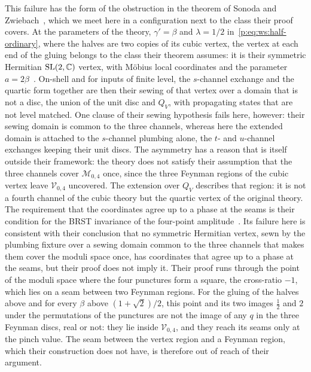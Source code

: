 This failure has the form of the obstruction in the theorem of Sonoda and Zwiebach~\cite{Sonoda:1990:CovariantClosedString}, which we meet here in a configuration next to the class their proof covers.
At the parameters of the theory, $\gamma' = \beta$ and $\lambda = 1 / 2$ in~\eqref{p:eq:ws:half-ordinary}, where the halves are two copies of its cubic vertex, the vertex at each end of the gluing belongs to the class their theorem assumes: it is their symmetric Hermitian $\mathrm{SL}(2, \mathbb{C})$ vertex, with Möbius local coordinates and the parameter $a = 2 \beta$~\cite[eq.~(2.18)]{Sonoda:1990:CovariantClosedString}.
On-shell and for inputs of finite level, the $s$-channel exchange and the quartic form together are then their sewing of that vertex over a domain that is not a disc, the union of the unit disc and $Q_V$, with propagating states that are not level matched.
One clause of their sewing hypothesis fails here, however: their sewing domain is common to the three channels, whereas here the extended domain is attached to the $s$-channel plumbing alone, the $t$- and $u$-channel exchanges keeping their unit discs.
The asymmetry has a reason that is itself outside their framework: the theory does not satisfy their assumption that the three channels cover $\mathcal M_{0,4}$ once, since the three Feynman regions of the cubic vertex leave $\mathcal V_{0,4}$ uncovered.
The extension over $Q_V$ describes that region: it is not a fourth channel of the cubic theory but the quartic vertex of the original theory.
The requirement that the coordinates agree up to a phase at the seams is their condition for the BRST invariance of the four-point amplitude~\cite[eq.~(3.49)]{Sonoda:1990:CovariantClosedString}.
Its failure here is consistent with their conclusion that no symmetric Hermitian vertex, sewn by the plumbing fixture over a sewing domain common to the three channels that makes them cover the moduli space once, has coordinates that agree up to a phase at the seams, but their proof does not imply it.
Their proof runs through the point of the moduli space where the four punctures form a square, the cross-ratio $-1$, which lies on a seam between two Feynman regions.
For the gluing of the halves above and for every $\beta$ above $(1 + \sqrt{2}) / 2$, this point and its two images $\tfrac{1}{2}$ and $2$ under the permutations of the punctures are not the image of any $q$ in the three Feynman discs, real or not: they lie inside $\mathcal V_{0,4}$, and they reach its seams only at the pinch value.
The seam between the vertex region and a Feynman region, which their construction does not have, is therefore out of reach of their argument.
